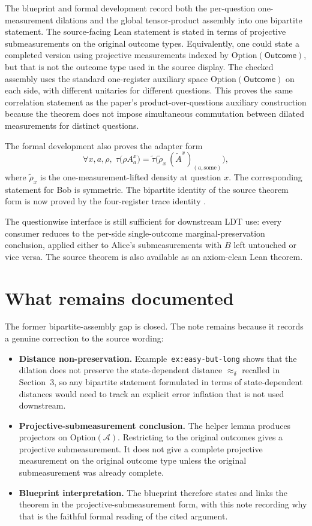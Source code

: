 \documentclass[11pt]{article}
\begin{document}
The blueprint and formal development record both the per-question
one-measurement dilations and the global tensor-product assembly into one
bipartite statement.  The source-facing Lean statement is stated in terms of
projective submeasurements on the original outcome types.  Equivalently, one
could state a completed version using projective measurements indexed by
\(\mathrm{Option}(\mathsf{Outcome})\), but that is not the outcome type used in
the source display.
The checked assembly uses the standard one-register auxiliary space
\(\mathrm{Option}(\mathsf{Outcome})\) on each side, with different unitaries
for different questions.  This proves the same correlation statement as the
paper's product-over-questions auxiliary construction because the theorem does
not impose simultaneous commutation between dilated measurements for distinct
questions.

The formal development also proves the adapter form
\[
  \forall x,a,\rho,\;
  \tau\bigl(\rho A^x_a\bigr)
  =\widetilde\tau\bigl(\widetilde\rho_x\,(\widetilde A^x)_{(a,\mathrm{some})}\bigr),
\]
where $\widetilde\rho_x$ is the one-measurement-lifted density at question $x$.
The corresponding statement for Bob is symmetric.  The bipartite identity of
the source theorem form is now proved by the four-register trace identity
.

The questionwise interface is still sufficient for downstream LDT use: every
consumer reduces to the per-side single-outcome marginal-preservation
conclusion, applied either to Alice's submeasurements with $B$ left untouched or
vice versa.  The source theorem is also available as an axiom-clean Lean
theorem.

\section{What remains documented}

The former bipartite-assembly gap is closed.  The note remains because it
records a genuine correction to the source wording:
\begin{itemize}
  \item \textbf{Distance non-preservation.}  Example~\texttt{ex:easy-but-long}
  shows that the dilation does not preserve the state-dependent distance
  $\approx_\delta$ recalled in Section~3, so any
  bipartite statement formulated in terms of state-dependent distances would
  need to track an explicit error inflation that is not used downstream.
  \item \textbf{Projective-submeasurement conclusion.}  The helper lemma
  produces projectors on \(\mathrm{Option}(\mathcal A)\).  Restricting to the
  original outcomes gives a projective submeasurement.  It does not give a
  complete projective measurement on the original outcome type unless the
  original submeasurement was already complete.
  \item \textbf{Blueprint interpretation.}  The blueprint therefore states and
  links the theorem in the projective-submeasurement form, with this note
  recording why that is the faithful formal reading of the cited argument.
\end{itemize}
\end{document}
